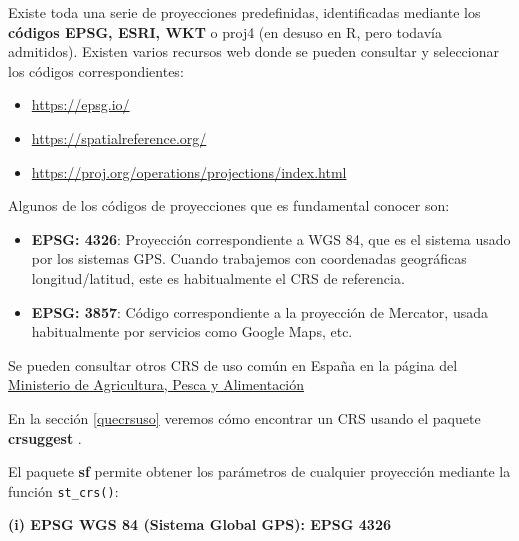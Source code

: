 \documentclass[
]{report}
\theoremstyle{definition}
\theoremstyle{definition}
\theoremstyle{definition}
\theoremstyle{definition}
\theoremstyle{remark}
\begin{document}
Existe toda una serie de proyecciones predefinidas, identificadas mediante los
\textbf{códigos EPSG, ESRI, WKT} o proj4 (en desuso en R, pero todavía admitidos).
Existen varios recursos web donde se pueden consultar y seleccionar los códigos
correspondientes:

\begin{itemize}
\item
  \url{https://epsg.io/}
\item
  \url{https://spatialreference.org/}
\item
  \url{https://proj.org/operations/projections/index.html}
\end{itemize}

Algunos de los códigos de proyecciones que es fundamental conocer son:

\begin{itemize}
\item
  \textbf{EPSG: 4326}: Proyección correspondiente a WGS 84, que es el sistema usado
  por los sistemas GPS. Cuando trabajemos con coordenadas geográficas
  longitud/latitud, este es habitualmente el CRS de referencia.
\item
  \textbf{EPSG: 3857}: Código correspondiente a la proyección de Mercator, usada
  habitualmente por servicios como Google Maps, etc.
\end{itemize}

Se pueden consultar otros CRS de uso común en España en la página del
\href{https://www.mapa.gob.es/es/cartografia-y-sig/ide/directorio_datos_servicios/caracteristicas_wms.aspx}{Ministerio de Agricultura, Pesca y
Alimentación}

En la sección \ref{quecrsuso} veremos cómo encontrar un CRS usando el paquete
\textbf{crsuggest} \citep{R-crsuggest}.

El paquete \textbf{sf} \citep{R-sf}permite obtener los parámetros de cualquier proyección
mediante la función \texttt{st\_crs()}:

\textbf{(i) EPSG WGS 84 (Sistema Global GPS): EPSG 4326}
\end{document}
